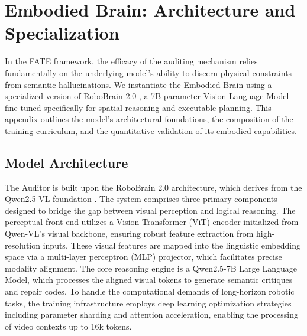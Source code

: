 \documentclass{article}
\theoremstyle{plain}
\theoremstyle{definition}
\theoremstyle{remark}
\begin{document}


\section{Embodied Brain: Architecture and Specialization}
\label{app:EmbodiedBrain}

In the FATE framework, the efficacy of the auditing mechanism relies fundamentally on the underlying model's ability to discern physical constraints from semantic hallucinations. We instantiate the Embodied Brain using a specialized version of RoboBrain 2.0 \citep{team2025robobrain}, a 7B parameter Vision-Language Model fine-tuned specifically for spatial reasoning and executable planning. This appendix outlines the model's architectural foundations, the composition of the training curriculum, and the quantitative validation of its embodied capabilities.

\subsection{Model Architecture}
The Auditor is built upon the RoboBrain 2.0 architecture, which derives from the Qwen2.5-VL foundation \citep{bai2023qwen}. The system comprises three primary components designed to bridge the gap between visual perception and logical reasoning. The perceptual front-end utilizes a Vision Transformer (ViT) encoder initialized from Qwen-VL's visual backbone, ensuring robust feature extraction from high-resolution inputs. These visual features are mapped into the linguistic embedding space via a multi-layer perceptron (MLP) projector, which facilitates precise modality alignment. The core reasoning engine is a Qwen2.5-7B Large Language Model, which processes the aligned visual tokens to generate semantic critiques and repair codes. To handle the computational demands of long-horizon robotic tasks, the training infrastructure employs deep learning optimization strategies including parameter sharding and attention acceleration, enabling the processing of video contexts up to 16k tokens.
\end{document}

